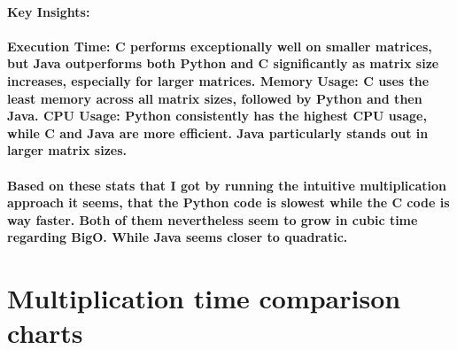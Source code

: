 \documentclass{article}
\begin{document}
\hfill 
\newline
\hfill 
\newline



\paragraph{Key Insights:}

\paragraph{
Execution Time: C performs exceptionally well on smaller matrices, but Java outperforms both Python and C significantly as matrix size increases, especially for larger matrices.
Memory Usage: C uses the least memory across all matrix sizes, followed by Python and then Java.
CPU Usage: Python consistently has the highest CPU usage, while C and Java are more efficient. Java particularly stands out in larger matrix sizes.
}

\paragraph{Based on these stats that I got by running the intuitive multiplication approach it seems, that the Python code is slowest while the C code is way faster. Both of them nevertheless seem to grow in cubic time regarding BigO. While Java seems closer to quadratic.}


\hfill 
\newline



\section{Multiplication time comparison charts}

\end{document}
